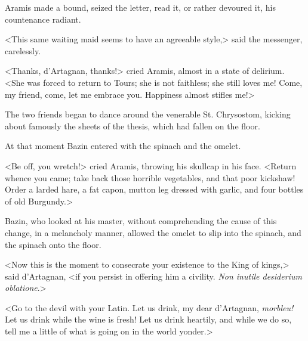 Aramis made a bound, seized the letter, read it, or rather devoured it, his countenance radiant. 

<This same waiting maid seems to have an agreeable style,> said the messenger, carelessly. 

<Thanks, d'Artagnan, thanks!> cried Aramis, almost in a state of delirium. <She was forced to return to Tours; she is not faithless; she still loves me! Come, my friend, come, let me embrace you. Happiness almost stifles me!> 

The two friends began to dance around the venerable St. Chrysostom, kicking about famously the sheets of the thesis, which had fallen on the floor. 

At that moment Bazin entered with the spinach and the omelet. 

<Be off, you wretch!> cried Aramis, throwing his skullcap in his face. <Return whence you came; take back those horrible vegetables, and that poor kickshaw! Order a larded hare, a fat capon, mutton leg dressed with garlic, and four bottles of old Burgundy.> 

Bazin, who looked at his master, without comprehending the cause of this change, in a melancholy manner, allowed the omelet to slip into the spinach, and the spinach onto the floor. 

<Now this is the moment to consecrate your existence to the King of kings,> said d'Artagnan, <if you persist in offering him a civility. \textit{Non inutile desiderium oblatione}.> 

<Go to the devil with your Latin. Let us drink, my dear d'Artagnan, \textit{morbleu!} Let us drink while the wine is fresh! Let us drink heartily, and while we do so, tell me a little of what is going on in the world yonder.> 